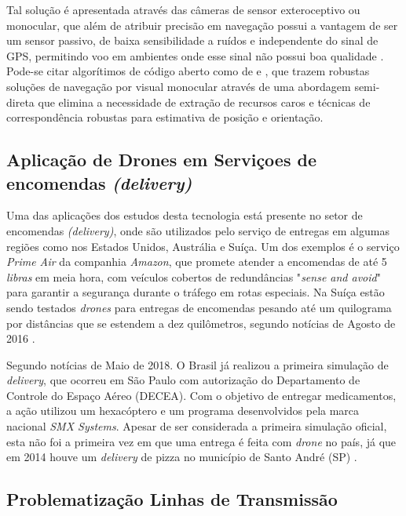 Tal solução é apresentada através das câmeras de sensor exteroceptivo ou monocular, que além de atribuir precisão em navegação possui a vantagem de ser um sensor passivo, de baixa sensibilidade a ruídos e independente do sinal de GPS, permitindo voo em ambientes onde esse sinal não possui boa qualidade \cite{GUO2014}. Pode-se citar algorítimos de código aberto como de \citet{Forster2014} e \citet{Raul2016}, que trazem robustas soluções de navegação por visual monocular através de uma abordagem semi-direta que elimina a necessidade de extração de recursos caros e técnicas de correspondência robustas para estimativa de posição e orientação.


\subsection{Aplicação de Drones em Serviçoes de encomendas \textit{(delivery)}}

Uma das aplicações dos estudos desta tecnologia está presente no setor de encomendas \textit{(delivery)}, onde são utilizados pelo serviço de entregas em algumas regiões como nos Estados Unidos, Austrália e Suíça. Um dos exemplos é o serviço \textit{Prime Air} da companhia \textit{Amazon}, que promete atender a encomendas de até 5 \textit{libras} em meia hora, com veículos cobertos de redundâncias "\textit{sense and avoid}" para garantir a segurança durante o tráfego em rotas especiais. Na Suíça estão sendo testados \textit{drones} para entregas de encomendas pesando até um quilograma por distâncias que se estendem a dez quilômetros, segundo notícias de Agosto de 2016 \cite{Vidal2016}.

Segundo notícias de Maio de 2018. O Brasil já realizou a primeira simulação de \textit{delivery}, que ocorreu em São Paulo com autorização do Departamento de Controle do Espaço Aéreo (DECEA). Com o objetivo de entregar medicamentos, a ação utilizou um hexacóptero e um programa desenvolvidos pela marca nacional \textit{SMX Systems}. Apesar de ser considerada a primeira simulação oficial, esta não foi a primeira vez em que uma entrega é feita com \textit{drone} no país, já que em 2014 houve um \textit{delivery} de pizza no município de Santo André (SP) \cite{Techtudo2018}.


\subsection{Problematização Linhas de Transmissão}

